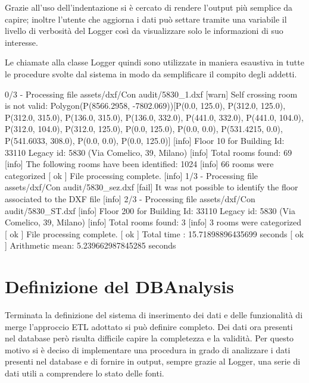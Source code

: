 \documentclass[12pt]{report}
\begin{document}
\vspace{5mm} %

Grazie all'uso dell'indentazione si è cercato di rendere l'output più semplice da capire; inoltre l'utente che aggiorna i dati può settare tramite una variabile il livello di verbosità del Logger così da visualizzare solo le informazioni di suo interesse. %

Le chiamate alla classe Logger quindi sono utilizzate in maniera esaustiva in tutte le procedure svolte dal sistema in modo da semplificare il compito degli addetti.

\newpage

\begin{outputl}[title=Esempio di output del Logger nel processamento di file DXF, frame=single]
[info] 0/3 - Processing file assets/dxf/Con audit/5830_1.dxf
       [warn] Self crossing room is not valid: 
       Polygon(P(8566.2958, -7802.069))[P(0.0, 125.0), 
       	P(312.0, 125.0), P(312.0, 315.0), P(136.0, 315.0), 
       	P(136.0, 332.0), P(441.0, 332.0), P(441.0, 104.0), 
       	P(312.0, 104.0), P(312.0, 125.0), P(0.0, 125.0), 
       	P(0.0, 0.0), P(531.4215, 0.0), P(541.6033, 308.0), 
       	P(0.0, 0.0), P(0.0, 125.0)]
       [info] Floor 10 for Building Id: 33110 Legacy id: 
       	5830 (Via Comelico, 39, Milano)
              [info] Total rooms found: 69
              [info] The following rooms have 
              		been identified: 1024
              [info] 66 rooms were categorized
       [ ok ] File processing complete.
[info] 1/3 - Processing file assets/dxf/Con audit/5830_sez.dxf
       [fail] It was not possible to identify the floor 
       	associated to the DXF file
[info] 2/3 - Processing file assets/dxf/Con audit/5830_ST.dxf
       [info] Floor 200 for Building Id: 33110 Legacy id: 
       	5830 (Via Comelico, 39, Milano)
              [info] Total rooms found: 3
              [info] 3 rooms were categorized
       [ ok ] File processing complete.
[ ok ] Total time     : 15.71898896435699 seconds
[ ok ] Arithmetic mean: 5.239662987845285 seconds

\end{outputl}


\newpage
\section{Definizione del DBAnalysis}

Terminata la definizione del sistema di inserimento dei dati e delle funzionalità di merge l'approccio ETL adottato si può definire completo.
Dei dati ora presenti nel database però risulta difficile capire la completezza e la validità.
Per questo motivo si è deciso di implementare una procedura in grado di analizzare i dati presenti nel database e di fornire in output, sempre grazie al Logger, una serie di dati utili a comprendere lo stato delle fonti.
\end{document}
